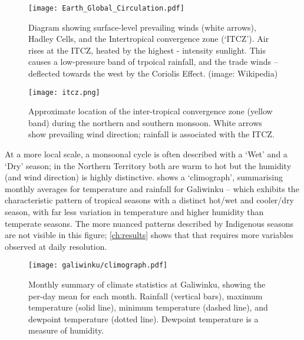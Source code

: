 \begin{figure}[p]
    \centering
    \texttt{[image: Earth\_Global\_Circulation.pdf]}
    \caption[Hadley Cells and trade-winds]{
        Diagram showing surface-level prevailing winds (white arrows),
        Hadley Cells, and the Intertropical convergence zone (`ITCZ').
        Air rises at the ITCZ, heated by the highest - intensity sunlight.
        This causes a low-pressure band of trpoical rainfall, and the
        trade winds -- deflected towards the west by the Coriolis Effect.
        (image: Wikipedia)}
    \label{fig:hadley-cells}
\vspace{1cm}
    \texttt{[image: itcz.png]}
    \caption[ITCZ showing northern and southern monsoon]{
        Approximate location of the inter-tropical convergence zone
        (yellow band) during the northern and southern monsoon.
        White arrows show prevailing wind direction; rainfall is
        associated with the ITCZ.  \citep[image:][]{boos2014}}
    \label{fig:itcz-india-aus}
\end{figure}

At a more local scale, a monsoonal cycle is often described with a `Wet'
and a `Dry' season; in the Northern Territory both are warm to hot but
the humidity (and wind direction) is highly distinctive.
%
 shows a `climograph', summarising monthly
averages for temperature and rainfall for Galiwinku -- which exhibits the
characteristic pattern of tropical seasons with a distinct hot/wet and
cooler/dry season, with far less variation in temperature and higher
humidity than temperate seasons.
%
The more nuanced patterns described by Indigenous seasons are not visible
in this figure; \cref{ch:results} shows that that requires more variables
observed at daily resolution.

\begin{figure}[h]
    \centering
    \texttt{[image: galiwinku/climograph.pdf]}
    \caption[Monthly Climograph for Galiwinku]{
        Monthly summary of climate statistics at Galiwinku, showing the per-day
        mean for each month.  Rainfall (vertical bars), maximum temperature
        (solid line), minimum temperature (dashed line), and  dewpoint
        temperature (dotted line).  Dewpoint temperature is a measure of humidity.}
    \label{fig:galiwinku-climograph}
\end{figure}

~\\

